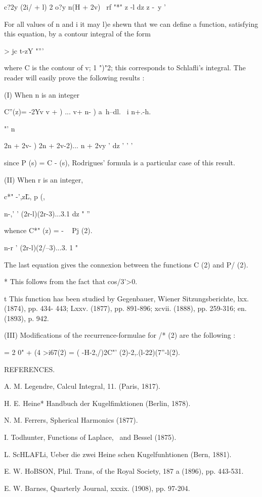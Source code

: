 {{{c?2y (2i/ + l) 2 o?y n(H + 2v) \ rf "*" z -l dz z -\ y '

For all values of n and i it may l)e shewn that we can define a
function, satisfying this equation, by a contour integral of the form

  > jc t-zY "'''

where C is the contour of v; 1 ")"2; this corresponds to Schlafli's
integral. The reader will easily prove the following results :

(I) When n is an integer

C''(z)= -2Yv v + ) ... v+ n- ) a\, h--dl. \ i n+.-h.

"' n\ \ {2n + 2v- ) 2n + 2v-2)... n + 2vy ' dz ' ' '

since P (s) = C - (s), Rodrigues' formula is a particular case of this
result.

(II) When r is an integer,

c*" -',z\= L, p (,\

n-,' ' (2r-l)(2r-3)...3.1 dz " ''

whence C*" (z) = - ~ Pj (2).

n-r ' (2r-l)(2/--3)...3. 1 "

The last equation gives the connexion between the functions C (2) and
P/ (2).

* This follows from the fact that cos/3'>0.

t This function has been studied by Gegenbauer, Wiener
Sitzungsberichte, lxx. (1874), pp. 434- 443; Lxxv. (1877), pp.
891-896; xcvii. (1888), pp. 259-316; en. (1893), p. 942.

%
%

(III) Modifications of the recurrence-formulae for /* (2) are the
following :

   = 2 0" + (4 >i67(2) = ( -H-2,/)2C"' (2)-2,.(l-22)(7''-l(2).

REFERENCES.

A. M. Legendre, Calcul Integral, 11. (Paris, 1817).

H. E. Heine* Handbuch der Kugelfimktionen (Berlin, 1878).

N. M. Ferrers, Spherical Harmonics (1877).

I. Todhunter, Functions of Laplace, \Lame\ and Bessel (1875).

L. ScHLAFLi, Ueber die zwei Heine schen Kugelfunhtionen (Bern, 1881).

E. W. HoBSON, Phil. Trans, of the Royal Society, 187 a (1896), pp.
443-531.

E. W. Barnes, Quarterly Journal, xxxix. (1908), pp. 97-204.

}}}}
